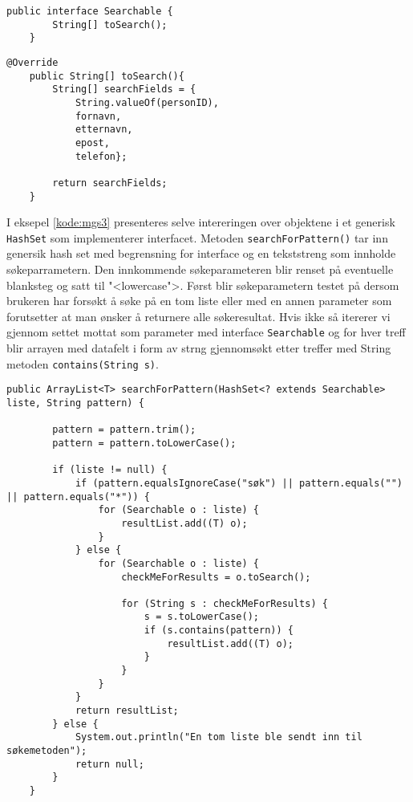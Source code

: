 \begin{lstlisting}[caption=Oversikt over \texttt{Searchable} interface, label=kode:mgs1]
	public interface Searchable {
   		String[] toSearch();
	}
\end{lstlisting}

\begin{lstlisting}[caption=Implemntasjon av metode \texttt{toSearch() i klassen Person.java}, label=kode:mgs2]
	@Override
    public String[] toSearch(){
        String[] searchFields = {
            String.valueOf(personID), 
            fornavn, 
            etternavn, 
            epost, 
            telefon};
        
        return searchFields;
    }
\end{lstlisting}

I eksepel \ref{kode:mgs3} presenteres selve intereringen over objektene i et generisk \texttt{HashSet} som implementerer interfacet. Metoden \texttt{searchForPattern()} tar inn genersik hash set med begrensning for interface og en tekststreng som innholde søkeparrametern. Den innkommende søkeparameteren blir renset på eventuelle blanksteg og satt til "<lowercase">. Først blir søkeparametern testet på dersom brukeren har forsøkt å søke på en tom liste eller med en annen parameter som forutsetter at man ønsker å returnere alle søkeresultat. Hvis ikke så itererer vi gjennom settet mottat som parameter med interface \texttt{Searchable} og for hver treff blir arrayen med datafelt i form av strng gjennomsøkt etter treffer med String metoden \texttt{contains(String s)}. 

\begin{lstlisting}[caption=Iterasjon over generisk \texttt{HashSet} som implementerer interface \texttt{Searchable}, label=kode:mgs3]
    public ArrayList<T> searchForPattern(HashSet<? extends Searchable> liste, String pattern) {

        pattern = pattern.trim();
        pattern = pattern.toLowerCase();

        if (liste != null) {
            if (pattern.equalsIgnoreCase("søk") || pattern.equals("") || pattern.equals("*")) {
                for (Searchable o : liste) {
                    resultList.add((T) o);
                }
            } else {
                for (Searchable o : liste) {
                    checkMeForResults = o.toSearch();

                    for (String s : checkMeForResults) {
                        s = s.toLowerCase();
                        if (s.contains(pattern)) {
                            resultList.add((T) o);
                        }
                    }
                }
            }
            return resultList;
        } else {
            System.out.println("En tom liste ble sendt inn til søkemetoden");
            return null;
        }
    }
\end{lstlisting}


